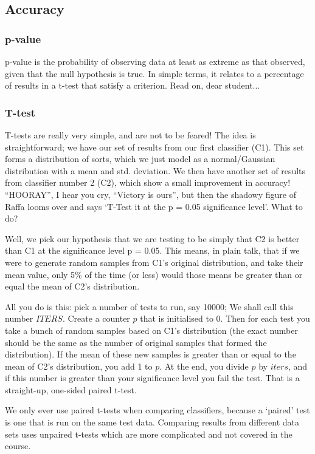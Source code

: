 \documentclass{article}
\begin{document}
    \subsection{Accuracy}
        \subsubsection{p-value}
            p-value is the probability of observing data at least as extreme as that observed, given that the null hypothesis is true. In simple terms, it relates to a percentage of results in a t-test that satisfy a criterion. Read on, dear student...
            
        \subsubsection{T-test}
            T-tests are really very simple, and are not to be feared! The idea is straightforward; we have our set of results from our first classifier (C1). This set forms a distribution of sorts, which we just model as a normal/Gaussian distribution with a mean and std. deviation. We then have another set of results from classifier number 2 (C2), which show a small improvement in accuracy! ``HOORAY'', I hear you cry, ``Victory is ours'', but then the shadowy figure of Raffa looms over and says `T-Test it at the p = 0.05 significance level'. What to do?
            
            Well, we pick our hypothesis that we are testing to be simply that C2 is better than C1 at the significance level p = 0.05. This means, in plain talk, that if we were to generate random samples from C1's original distribution, and take their mean value, only 5\% of the time (or less) would those means be greater than or equal the mean of C2's distribution.
            
            All you do is this: pick a number of tests to run, say 10000; We shall call this number $ITERS$. Create a counter $p$ that is initialised to 0. Then for each test you take a bunch of random samples based on C1's distribution (the exact number should be the same as the number of original samples that formed the distribution). If the mean of these new samples is greater than or equal to the mean of C2's distribution, you add 1 to $p$. At the end, you divide $p$ by $iters$, and if this number is greater than your significance level you fail the test. That is a straight-up, one-sided paired t-test.
            
            We only ever use paired t-tests when comparing classifiers, because a `paired' test is one that is run on the same test data. Comparing results from different data sets uses unpaired t-tests which are more complicated and not covered in the course.
            
\end{document}
